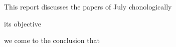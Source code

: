 \newpage
\thispagestyle{empty}

This report discusses the papers of July chonologically


its objective

we come to the conclusion that

{\hypersetup{linkcolor=black}\tableofcontents}
